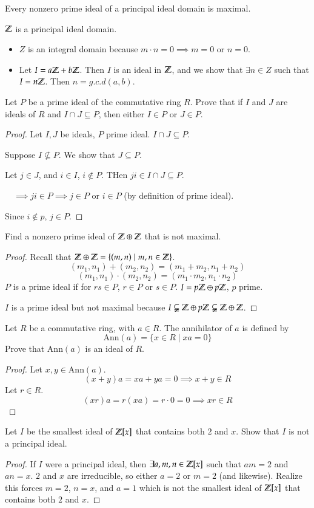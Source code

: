 \begin{theorem}
	Every nonzero prime ideal of a principal ideal domain is maximal. 
\end{theorem}

\example $\mathbb{Z}$ is a principal ideal domain. 
\begin{itemize}
	\item $Z$ is an integral domain because $m\cdot n = 0 \implies m = 0$ or $n=0$. 
	\item Let $I=a\mathbb{Z} + b\mathbb{Z}$. Then $I$ is an ideal in $\mathbb{Z}$, and we show that $\exists n\in Z$ such that $I=n\mathbb{Z}$. Then $\boxed{n=g.c.d(a,b)}$. 
\end{itemize}

\exercise Let $P$ be a prime ideal of the commutative ring $R$. Prove that if $I$ and $J$ are ideals of $R$ and $I\cap J\subseteq P$, then either $I\in P$ or $J\in P$. 
\begin{proof}
	Let $I,J$ be ideals, $P$ prime ideal. $I\cap J\subseteq P$. 
	
	Suppose $I\not\subseteq P$. We show that $J\subseteq P$. 
	
	Let $j\in J$, and $i\in I$, $i\not\in P$. THen $ji\in I\cap J\subseteq P$. 
	
	$\quad \implies ji\in P \implies j \in P$ or $i\in P$ (by definition of prime ideal). 
	
	Since $i\not\in p$, $j\in P$. 
\end{proof}

\exercise Find a nonzero prime ideal of $\mathbb{Z} \oplus \mathbb{Z}$ that is not maximal. 
\begin{proof}
	Recall that $\mathbb{Z}\oplus \mathbb{Z} = \{(m,n)\mid m,n\in \mathbb{Z}\}$. 
	\[(m_1,n_1)+(m_2,n_2)=(m_1+m_2,n_1+n_2)\]
	\[(m_1,n_1)\cdot(m_2,n_2)=(m_1\cdot m_2,n_1\cdot n_2)\]
	$P$ is a prime ideal if for $rs\in P$, $r\in P$ or $s\in P$. 
	$I=p\mathbb{Z} \oplus p\mathbb{Z}$, $p$ prime. 
	
	$I$ is a prime ideal but not maximal because $I\subsetneqq \mathbb{Z}\oplus p\mathbb{Z}\subsetneqq \mathbb{Z} \oplus \mathbb{Z}$. 
\end{proof}

\exercise Let $R$ be a commutative ring, with $a\in R$. The annihilator of $a$ is defined by 
\[\mathrm{Ann}(a)=\{x\in R\mid xa=0\}\]
Prove that $\mathrm{Ann}(a)$ is an ideal of $R$. 
\begin{proof}
	Let $x,y\in \mathrm{Ann}(a)$. 
	\[(x+y)a=xa+ya = 0\implies x+y\in R\]
	Let $r\in R$. 
	\[(xr)a = r(xa) = r\cdot 0 = 0\implies xr \in R\]
\end{proof}

\exercise Let $I$ be the smallest ideal of $\mathbb{Z}[x]$ that contains both $2$ and $x$. Show that $I$ is not a principal ideal. 
\begin{proof}
	If $I$ were a principal ideal, then $\exists a,m,n\in \mathbb{Z}[x]$ such that $am=2$ and $an=x$. $2$ and $x$ are irreducible, so either $a = 2$ or $m=2$ (and likewise). Realize this forces $m=2$, $n=x$, and $a=1$ which is not the smallest ideal of $\mathbb{Z}[x]$ that contains both $2$ and $x$. 
\end{proof}
